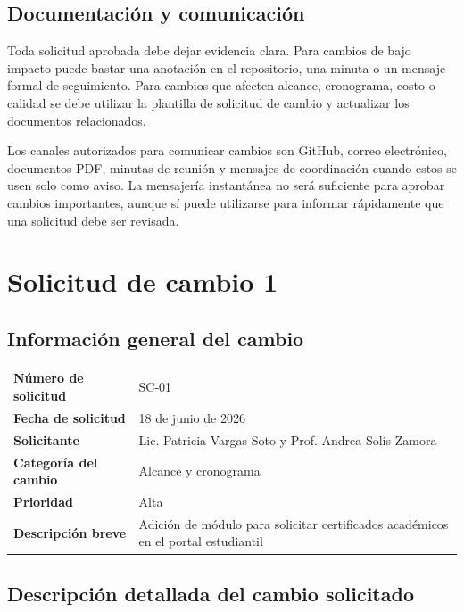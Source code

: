 \documentclass[11pt,spanish]{article}
\begin{document}
\subsection{Documentación y comunicación}

Toda solicitud aprobada debe dejar evidencia clara. Para cambios de bajo impacto puede bastar una anotación en el repositorio, una minuta o un mensaje formal de seguimiento. Para cambios que afecten alcance, cronograma, costo o calidad se debe utilizar la plantilla de solicitud de cambio y actualizar los documentos relacionados.

Los canales autorizados para comunicar cambios son GitHub, correo electrónico, documentos PDF, minutas de reunión y mensajes de coordinación cuando estos se usen solo como aviso. La mensajería instantánea no será suficiente para aprobar cambios importantes, aunque sí puede utilizarse para informar rápidamente que una solicitud debe ser revisada.



\newpage
\section{Solicitud de cambio 1}

\subsection{Información general del cambio}

\begin{table}[H]
\centering
\begin{tabularx}{\textwidth}{p{5cm} Y}
\toprule
\textbf{Número de solicitud} & SC-01 \\
\textbf{Fecha de solicitud} & 18 de junio de 2026 \\
\textbf{Solicitante} & Lic. Patricia Vargas Soto y Prof. Andrea Solís Zamora \\
\textbf{Categoría del cambio} & Alcance y cronograma \\
\textbf{Prioridad} & Alta \\
\textbf{Descripción breve} & Adición de módulo para solicitar certificados académicos en el portal estudiantil \\
\bottomrule
\end{tabularx}
\end{table}

\subsection{Descripción detallada del cambio solicitado}
\end{document}
